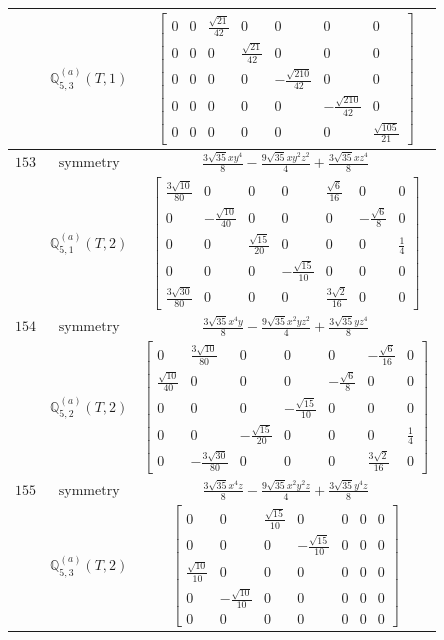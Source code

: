 \documentclass[fleqn,8pt,landscape]{jsarticle}
\begin{document}
\begin{longtable}{ccc}
$  $ & $ \mathbb{Q}_{5,3}^{(a)}(T,1) $ & $ \begin{bmatrix} 0 & 0 & \frac{\sqrt{21}}{42} & 0 & 0 & 0 & 0 \\ 0 & 0 & 0 & \frac{\sqrt{21}}{42} & 0 & 0 & 0 \\ 0 & 0 & 0 & 0 & - \frac{\sqrt{210}}{42} & 0 & 0 \\ 0 & 0 & 0 & 0 & 0 & - \frac{\sqrt{210}}{42} & 0 \\ 0 & 0 & 0 & 0 & 0 & 0 & \frac{\sqrt{105}}{21} \end{bmatrix} $ \\ \hline
$ 153 $ & $ \text{symmetry} $ & $ \frac{3 \sqrt{35} x y^{4}}{8} - \frac{9 \sqrt{35} x y^{2} z^{2}}{4} + \frac{3 \sqrt{35} x z^{4}}{8} $ \\
$  $ & $ \mathbb{Q}_{5,1}^{(a)}(T,2) $ & $ \begin{bmatrix} \frac{3 \sqrt{10}}{80} & 0 & 0 & 0 & \frac{\sqrt{6}}{16} & 0 & 0 \\ 0 & - \frac{\sqrt{10}}{40} & 0 & 0 & 0 & - \frac{\sqrt{6}}{8} & 0 \\ 0 & 0 & \frac{\sqrt{15}}{20} & 0 & 0 & 0 & \frac{1}{4} \\ 0 & 0 & 0 & - \frac{\sqrt{15}}{10} & 0 & 0 & 0 \\ \frac{3 \sqrt{30}}{80} & 0 & 0 & 0 & \frac{3 \sqrt{2}}{16} & 0 & 0 \end{bmatrix} $ \\ \hline
$ 154 $ & $ \text{symmetry} $ & $ \frac{3 \sqrt{35} x^{4} y}{8} - \frac{9 \sqrt{35} x^{2} y z^{2}}{4} + \frac{3 \sqrt{35} y z^{4}}{8} $ \\
$  $ & $ \mathbb{Q}_{5,2}^{(a)}(T,2) $ & $ \begin{bmatrix} 0 & \frac{3 \sqrt{10}}{80} & 0 & 0 & 0 & - \frac{\sqrt{6}}{16} & 0 \\ \frac{\sqrt{10}}{40} & 0 & 0 & 0 & - \frac{\sqrt{6}}{8} & 0 & 0 \\ 0 & 0 & 0 & - \frac{\sqrt{15}}{10} & 0 & 0 & 0 \\ 0 & 0 & - \frac{\sqrt{15}}{20} & 0 & 0 & 0 & \frac{1}{4} \\ 0 & - \frac{3 \sqrt{30}}{80} & 0 & 0 & 0 & \frac{3 \sqrt{2}}{16} & 0 \end{bmatrix} $ \\ \hline
$ 155 $ & $ \text{symmetry} $ & $ \frac{3 \sqrt{35} x^{4} z}{8} - \frac{9 \sqrt{35} x^{2} y^{2} z}{4} + \frac{3 \sqrt{35} y^{4} z}{8} $ \\
$  $ & $ \mathbb{Q}_{5,3}^{(a)}(T,2) $ & $ \begin{bmatrix} 0 & 0 & \frac{\sqrt{15}}{10} & 0 & 0 & 0 & 0 \\ 0 & 0 & 0 & - \frac{\sqrt{15}}{10} & 0 & 0 & 0 \\ \frac{\sqrt{10}}{10} & 0 & 0 & 0 & 0 & 0 & 0 \\ 0 & - \frac{\sqrt{10}}{10} & 0 & 0 & 0 & 0 & 0 \\ 0 & 0 & 0 & 0 & 0 & 0 & 0 \end{bmatrix} $ \\ \hline

\end{longtable}
\end{document}

